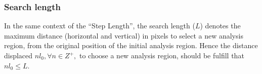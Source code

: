 \subsubsection{Search length}
In the same context of the ``Step Length'', the search length ($L$) denotes the maximum
distance (horizontal and vertical) in pixels to select a new  analysis region, 
from the original position of the initial analysis region. Hence 
the distance displaced $nl_0, \forall n\in Z^+,$ to choose a new analysis region,
should be fulfill that $nl_0\leq L$.
